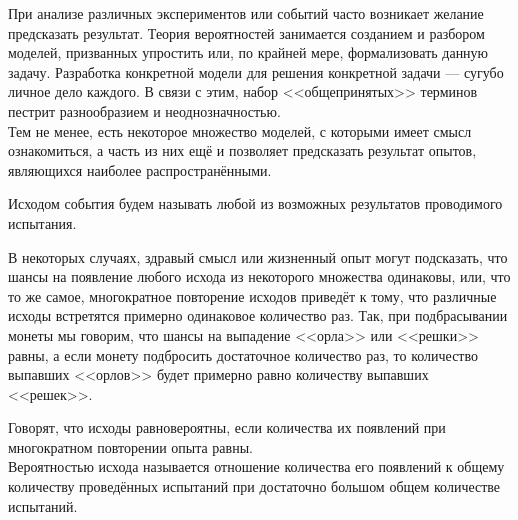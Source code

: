 \documentclass[a4paper,12pt]{article}
\begin{document}

При анализе различных экспериментов или событий часто возникает желание предсказать результат. Теория вероятностей занимается созданием и разбором моделей, призванных упростить или, по крайней мере, формализовать данную задачу. Разработка конкретной модели для решения конкретной задачи --- сугубо личное дело каждого. В связи с этим, набор <<общепринятых>> терминов пестрит разнообразием и неоднозначностью.\\
Тем не менее, есть некоторое множество моделей, с которыми имеет смысл ознакомиться, 
а часть из них ещё и позволяет предсказать результат опытов, являющихся наиболее распространёнными.


     Исходом события будем называть  любой из возможных результатов проводимого испытания.


В некоторых случаях, здравый смысл или жизненный опыт могут подсказать, что шансы на появление любого исхода из некоторого множества одинаковы, или, что то же самое, многократное повторение исходов приведёт к тому, что различные исходы встретятся примерно одинаковое количество раз. Так, при подбрасывании монеты мы говорим, что шансы на выпадение <<орла>> или <<решки>> равны, а если монету подбросить достаточное количество раз, то количество выпавших <<орлов>> будет примерно равно количеству выпавших <<решек>>.

  Говорят, что исходы  равновероятны, если количества их появлений при многократном повторении опыта равны.\\
   Вероятностью исхода называется отношение количества его появлений к общему количеству проведённых испытаний при достаточно большом общем количестве испытаний.
\end{document}
